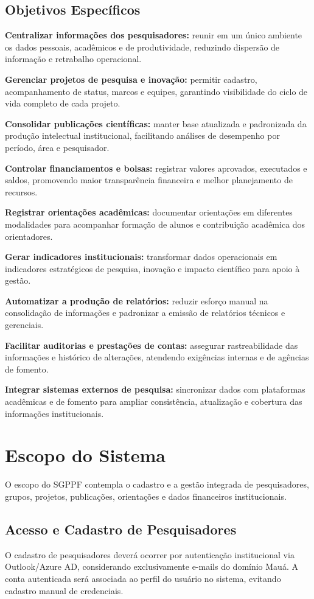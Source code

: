\documentclass[12pt,a4paper]{article}
\begin{document}
\subsection{Objetivos Específicos}
\textbf{Centralizar informações dos pesquisadores:} reunir em um único ambiente os dados pessoais, acadêmicos e de produtividade, reduzindo dispersão de informação e retrabalho operacional.

\textbf{Gerenciar projetos de pesquisa e inovação:} permitir cadastro, acompanhamento de status, marcos e equipes, garantindo visibilidade do ciclo de vida completo de cada projeto.

\textbf{Consolidar publicações científicas:} manter base atualizada e padronizada da produção intelectual institucional, facilitando análises de desempenho por período, área e pesquisador.

\textbf{Controlar financiamentos e bolsas:} registrar valores aprovados, executados e saldos, promovendo maior transparência financeira e melhor planejamento de recursos.

\textbf{Registrar orientações acadêmicas:} documentar orientações em diferentes modalidades para acompanhar formação de alunos e contribuição acadêmica dos orientadores.

\textbf{Gerar indicadores institucionais:} transformar dados operacionais em indicadores estratégicos de pesquisa, inovação e impacto científico para apoio à gestão.

\textbf{Automatizar a produção de relatórios:} reduzir esforço manual na consolidação de informações e padronizar a emissão de relatórios técnicos e gerenciais.

\textbf{Facilitar auditorias e prestações de contas:} assegurar rastreabilidade das informações e histórico de alterações, atendendo exigências internas e de agências de fomento.

\textbf{Integrar sistemas externos de pesquisa:} sincronizar dados com plataformas acadêmicas e de fomento para ampliar consistência, atualização e cobertura das informações institucionais.

\section{Escopo do Sistema}
O escopo do SGPPF contempla o cadastro e a gestão integrada de pesquisadores, grupos, projetos, publicações, orientações e dados financeiros institucionais.

\subsection{Acesso e Cadastro de Pesquisadores}
O cadastro de pesquisadores deverá ocorrer por autenticação institucional via Outlook/Azure AD, considerando exclusivamente e-mails do domínio Mauá. A conta autenticada será associada ao perfil do usuário no sistema, evitando cadastro manual de credenciais.
\end{document}
